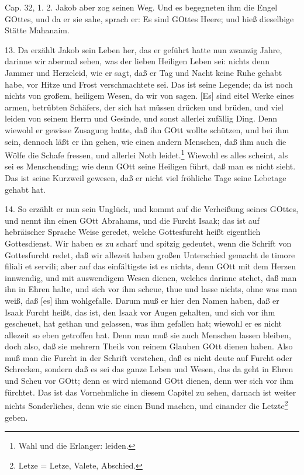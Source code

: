 Cap. 32, 1. 2. Jakob aber zog seinen Weg. Und es begegneten ihm die Engel GOttes, und da er sie sahe, sprach er: Es sind GOttes Heere; und hieß dieselbige Stätte Mahanaim.

13. Da erzählt Jakob sein Leben her, das er geführt hatte nun zwanzig Jahre, darinne wir abermal sehen, was der lieben Heiligen Leben sei: nichts denn Jammer und Herzeleid, wie er sagt, daß er Tag und Nacht keine Ruhe gehabt habe, vor Hitze und Frost verschmachtete sei. Das ist seine Legende; da ist noch nichts von großem, heiligem Wesen, da wir von sagen. [Es] sind eitel Werke eines armen, betrübten Schäfers, der sich hat müssen drücken und brüden, und viel leiden von seinem Herrn und Gesinde, und sonst allerlei zufällig Ding. Denn wiewohl er gewisse
Zusagung hatte, daß ihn GOtt wollte schützen, und bei ihm sein, dennoch läßt er ihn gehen, wie einen andern Menschen, daß ihm auch die Wölfe die Schafe fressen, und allerlei Noth leidet.\footnote{Wahl und die Erlanger: leiden.} Wiewohl es alles scheint, als sei es Menschending; wie denn GOtt seine Heiligen führt, daß man es nicht sieht. Das ist seine Kurzweil gewesen, daß er nicht viel fröhliche Tage seine Lebetage gehabt hat.

14. So erzählt er nun sein Unglück, und kommt auf die Verheißung seines GOttes, und nennt ihn einen GOtt Abrahams, und die Furcht Isaak; das ist auf hebräischer Sprache Weise geredet, welche Gottesfurcht heißt eigentlich Gottesdienst. Wir haben es zu scharf und spitzig gedeutet, wenn die Schrift von Gottesfurcht redet, daß wir allezeit haben großen Unterschied gemacht de timore filiali et servili; aber auf das einfältigste ist es nichts, denn GOtt mit dem Herzen innwendig, und mit auswendigem Wesen dienen, welches darinne stehet, daß man ihn in Ehren halte, und sich vor ihm scheue, thue und lasse nichts, ohne was man weiß, daß [es] ihm wohlgefalle. Darum muß er hier den Namen haben, daß er Isaak Furcht heißt, das ist, den Isaak vor Augen gehalten, und sich vor ihm gescheuet, hat gethan und gelassen, was ihm gefallen hat; wiewohl er es nicht allezeit so eben getroffen hat. Denn man muß sie auch Menschen lassen bleiben, doch also, daß sie mehrern Theils von reinem Glauben GOtt dienen haben. Also muß man die Furcht in der Schrift verstehen, daß es nicht deute auf Furcht oder Schrecken, sondern daß es sei das ganze Leben und Wesen, das da geht in Ehren und Scheu vor GOtt; denn es wird niemand GOtt dienen, denn wer sich vor ihm fürchtet. Das ist das Vornehmliche in diesem Capitel zu sehen, darnach ist weiter nichts Sonderliches, denn wie sie einen Bund machen, und einander die Letzte\footnote{Letze = Letze, Valete, Abschied.} geben.

